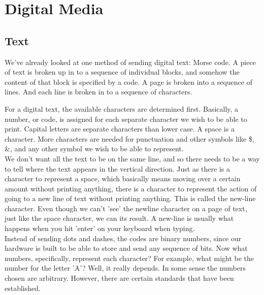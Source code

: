 \chapter{Digital Media}

\section{Text}

We've already looked at one method of sending digital text: Morse code. A piece of text is broken up in to a sequence of individual blocks, and somehow the content of that block is specified by a code. A page is broken into a sequence of lines. And each line is broken in to a sequence of characters.\\

\begin{center}\end{center}

For a digital text, the available characters are determined first. Basically, a number, or code, is assigned for each separate character we wish to be able to print. Capital letters are separate characters than lower case. A space is a character. More characters are needed for punctuation and other symbols like \$, \&, and any other symbol we wish to be able to represent.\\

We don't want all the text to be on the same line, and so there needs to be a way to tell where the text appears in the vertical direction. Just as there is a character to represent a space, which basically means moving over a certain amount without printing anything, there is a character to represent the action of going to a new line of text without printing anything. This is called the new-line character. Even though we can't 'see' the newline character on a page of text, just like the space character, we can its result. A new-line is usually what happens when you hit 'enter' on your keyboard when typing.\\

Instead of sending dots and dashes, the codes are binary numbers, since our hardware is built to be able to store and send any sequence of bits. Now what numbers, specifically, represent each character? For example, what might be the number for the letter 'A'? Well, it really depends. In some sense the numbers chosen are arbitrary. However, there are certain standards that have been established.\\

